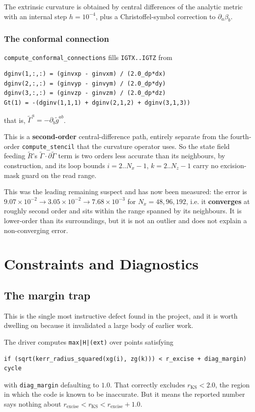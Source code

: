 The extrinsic curvature is obtained by central differences of the analytic
metric with an internal step $h = 10^{-4}$, plus a Christoffel-symbol
correction to $\partial_a\beta_b$.

\subsubsection{The conformal connection}

\texttt{compute\_conformal\_connections} fills \texttt{IGTX..IGTZ} from
\begin{lstlisting}
dginv(1,:,:) = (ginvxp - ginvxm) / (2.0_dp*dx)
dginv(2,:,:) = (ginvyp - ginvym) / (2.0_dp*dy)
dginv(3,:,:) = (ginvzp - ginvzm) / (2.0_dp*dz)
Gt(1) = -(dginv(1,1,1) + dginv(2,1,2) + dginv(3,1,3))
\end{lstlisting}
that is, $\tilde{\Gamma}^a = -\partial_b \tilde{g}^{ab}$.

\gotcha
This is a \textbf{second-order} central-difference path, entirely separate
from the fourth-order \texttt{compute\_stencil} that the curvature operator
uses. So the state field feeding $\tilde{R}$'s $\tilde{\Gamma}\cdot\partial
\tilde{\Gamma}$ term is two orders less accurate than its neighbours, by
construction, and its loop bounds $i = 2..N_x-1$, $k = 2..N_z-1$ carry no
excision-mask guard on the read range.

This was the leading remaining suspect and has now been measured: the error is
$9.07\times10^{-2} \to 3.05\times10^{-2} \to 7.68\times10^{-3}$ for
$N_x = 48, 96, 192$, i.e. it \textbf{converges} at roughly second order and
sits within the range spanned by its neighbours. It is lower-order than its
surroundings, but it is not an outlier and does not explain a
non-converging error.

\section{Constraints and Diagnostics}
\label{ch:diag}

\subsection{The margin trap}

This is the single most instructive defect found in the project, and it is
worth dwelling on because it invalidated a large body of earlier work.

The driver computes \texttt{max|H|(ext)} over points satisfying
\begin{lstlisting}
if (sqrt(kerr_radius_squared(xg(i), zg(k))) < r_excise + diag_margin) cycle
\end{lstlisting}
with \texttt{diag\_margin} defaulting to $1.0$. That correctly excludes
$r_{\mathrm{KS}} < 2.0$, the region in which the code is known to be
inaccurate. But it means the reported number says nothing about
$r_{\mathrm{excise}} < r_{\mathrm{KS}} < r_{\mathrm{excise}} + 1.0$.

